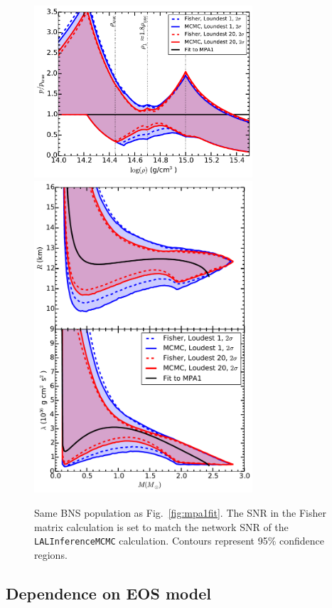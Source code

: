 \documentclass[twocolumn,prd,amssymb,aps,nofootinbib,showpacs,epsf]{revtex4}
\begin{document}
\begin{figure}[!htb]
\begin{center}
\includegraphics[width=3.2in]{CompareLALFisherZeroNoiseperror.pdf}\\
\includegraphics[width=3.2in]{CompareLALFisherZeroNoiseRadiuslambda.pdf}
\caption{Same BNS population as Fig.~\ref{fig:mpa1fit}. The SNR in the Fisher matrix calculation is set to match the network SNR of the \texttt{LALInferenceMCMC} calculation. Contours represent 95\% confidence regions.}
\label{fig:fisher}
\end{center}
\end{figure}


\subsection{Dependence on EOS model}
\end{document}
